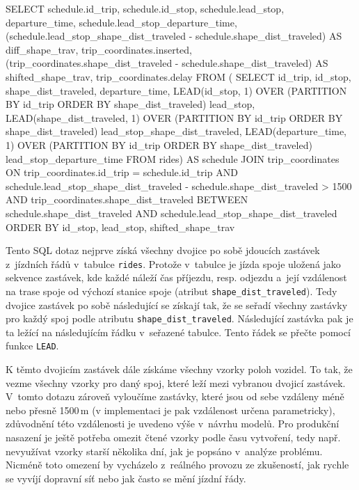 \begin{code}[frame=none]
SELECT schedule.id_trip,
  schedule.id_stop,
  schedule.lead_stop,
  departure_time,
  schedule.lead_stop_departure_time,
  (schedule.lead_stop_shape_dist_traveled -
    schedule.shape_dist_traveled)
      AS diff_shape_trav,
  trip_coordinates.inserted,
  (trip_coordinates.shape_dist_traveled -
    schedule.shape_dist_traveled)
      AS shifted_shape_trav,
  trip_coordinates.delay
FROM (
  SELECT id_trip, id_stop, shape_dist_traveled, departure_time,
    LEAD(id_stop, 1) OVER (PARTITION BY id_trip
	  ORDER BY shape_dist_traveled) lead_stop,
    LEAD(shape_dist_traveled, 1) OVER (PARTITION BY id_trip
	  ORDER BY shape_dist_traveled) lead_stop_shape_dist_traveled,
    LEAD(departure_time, 1) OVER (PARTITION BY id_trip
	  ORDER BY shape_dist_traveled) lead_stop_departure_time
  FROM rides) AS schedule
JOIN trip_coordinates
ON trip_coordinates.id_trip = schedule.id_trip AND
  schedule.lead_stop_shape_dist_traveled -
    schedule.shape_dist_traveled > 1500 AND
  trip_coordinates.shape_dist_traveled
    BETWEEN schedule.shape_dist_traveled AND
  schedule.lead_stop_shape_dist_traveled
ORDER BY id_stop, lead_stop, shifted_shape_trav
\end{code}


Tento SQL dotaz nejprve získá všechny dvojice po sobě jdoucích zastávek z~jízdních řádů v~tabulce \verb-rides-. Protože v~tabulce je jízda spoje uložená jako sekvence zastávek, kde každé náleží čas příjezdu, resp. odjezdu a~její vzdálenost na trase spoje od výchozí stanice spoje (atribut \verb-shape_dist_traveled-). Tedy dvojice zastávek po sobě následující se získají tak, že se seřadí všechny zastávky pro každý spoj podle atributu \verb-shape_dist_traveled-. Následující zastávka pak je ta ležící na následujícím řádku v~seřazené tabulce. Tento řádek se přečte pomocí funkce \verb-LEAD-.


\bigbreak


K těmto dvojicím zastávek dále získáme všechny vzorky poloh vozidel. To tak, že vezme všechny vzorky pro daný spoj, které leží mezi vybranou dvojicí zastávek. V~tomto dotazu zároveň vyloučíme zastávky, které jsou od sebe vzdáleny méně nebo přesně 1500\,m (v implementaci je pak vzdálenost určena parametricky), zdůvodnění této vzdálenosti je uvedeno výše v~návrhu modelů. Pro produkční nasazení je ještě potřeba omezit čtené vzorky podle času vytvoření, tedy např. nevyužívat vzorky starší několika dní, jak je popsáno v~analýze problému. Nicméně toto omezení by vycházelo z~reálného provozu ze zkušeností, jak rychle se vyvíjí dopravní síť nebo jak často se mění jízdní řády.


